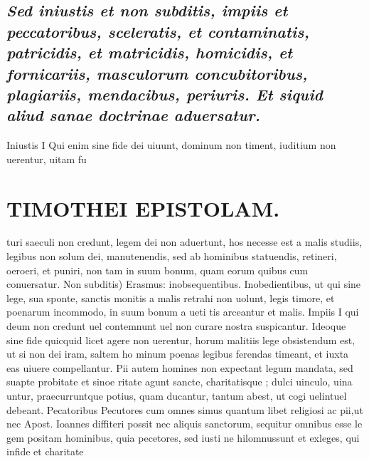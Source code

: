\documentclass{article}
\begin{document}
\begin{pages}
\subsection*{\textit{Sed iniustis et non subditis, impiis et peccatoribus, sceleratis, et contaminatis, patricidis, et matricidis, homicidis, et fornicariis, masculorum concubitoribus, plagiariis, mendacibus, periuris. Et siquid aliud sanae doctrinae aduersatur. }}\pstart Iniustis I Qui enim sine fide dei uiuunt, dominum non timent, iuditium non uerentur, uitam fu\pend
\section*{TIMOTHEI EPISTOLAM. }
\marginpar{[ p.19 ]}\pstart turi saeculi non credunt, legem dei non aduertunt, hos necesse est a malis studiis, legibus non solum dei, manutenendis, sed ab hominibus statuendis, retineri, oeroeri, et puniri, non tam in suum bonum, quam eorum quibus cum conuersatur.  \pend\pstart Non subditis) Erasmus: inobsequentibus.  \pend\pstart Inobedientibus, ut qui sine lege, sua sponte, sanctis monitis a malis retrahi non uolunt, legis timore, et poenarum incommodo, in suum bonum a ueti tis arceantur et malis.  \pend\pstart Impiis I qui deum non credunt uel contemnunt uel non curare nostra suspicantur. Ideoque sine fide quicquid licet agere non uerentur, horum malitiis lege obsistendum est, ut si non dei iram, saltem ho minum poenas legibus ferendas timeant, et iuxta eas uiuere compellantur. Pii autem homines non expectant legum mandata, sed suapte probitate et sinoe ritate agunt sancte, charitatisque ; dulci uinculo, uina untur, praecurruntque potius, quam ducantur, tantum abest, ut cogi uelintuel debeant.  \pend\pstart Pecatoribus Pecutores cum omnes simus quantum libet religiosi ac pii,ut nec Apost. Ioannes diffiteri possit nec aliquis sanctorum, sequitur omnibus esse le gem positam hominibus, quia pecetores, sed iusti ne hilomnussunt et exleges, qui infide et charitate  \pend

\end{pages}
\end{document}
